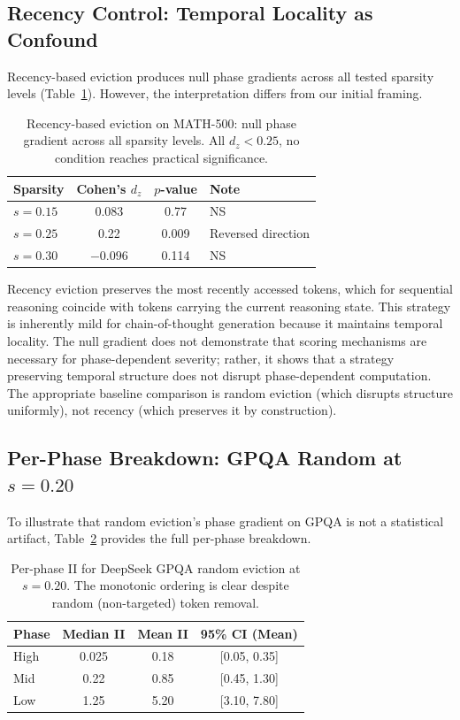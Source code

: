 \documentclass[11pt,a4paper]{article}
\begin{document}
\subsection{Recency Control: Temporal Locality as Confound}

Recency-based eviction produces null phase gradients across all tested sparsity levels (Table~\ref{tab:recency}). However, the interpretation differs from our initial framing.

\begin{table}[h]
\centering
\caption{Recency-based eviction on MATH-500: null phase gradient across all sparsity levels. All $d_z < 0.25$, no condition reaches practical significance.}
\label{tab:recency}
\begin{tabular}{lccl}
\toprule
Sparsity & Cohen's $d_z$ & $p$-value & Note \\
\midrule
$s=0.15$ & 0.083 & 0.77 & NS \\
$s=0.25$ & 0.22 & 0.009 & Reversed direction \\
$s=0.30$ & $-0.096$ & 0.114 & NS \\
\bottomrule
\end{tabular}
\end{table}

Recency eviction preserves the most recently accessed tokens, which for sequential reasoning coincide with tokens carrying the current reasoning state. This strategy is inherently mild for chain-of-thought generation because it maintains temporal locality. The null gradient does not demonstrate that scoring mechanisms are necessary for phase-dependent severity; rather, it shows that a strategy preserving temporal structure does not disrupt phase-dependent computation. The appropriate baseline comparison is random eviction (which disrupts structure uniformly), not recency (which preserves it by construction).

\subsection{Per-Phase Breakdown: GPQA Random at $s=0.20$}

To illustrate that random eviction's phase gradient on GPQA is not a statistical artifact, Table~\ref{tab:gpqa_rand_detail} provides the full per-phase breakdown.

\begin{table}[h]
\centering
\caption{Per-phase II for DeepSeek GPQA random eviction at $s=0.20$. The monotonic ordering is clear despite random (non-targeted) token removal.}
\label{tab:gpqa_rand_detail}
\begin{tabular}{lccc}
\toprule
Phase & Median II & Mean II & 95\% CI (Mean) \\
\midrule
High & 0.025 & 0.18 & [0.05, 0.35] \\
Mid & 0.22 & 0.85 & [0.45, 1.30] \\
Low & 1.25 & 5.20 & [3.10, 7.80] \\
\bottomrule
\end{tabular}
\end{table}
\end{document}
